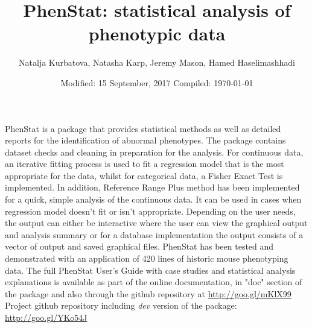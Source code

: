 \documentclass[a4paper]{article}
\begin{document}



\title{PhenStat: statistical analysis of phenotypic data}
\author{Natalja Kurbatova, Natasha Karp, Jeremy Mason, Hamed Haselimashhadi}
\date{Modified: 15 September, 2017 Compiled: \today}


\maketitle

PhenStat is a package that provides statistical methods as well as detailed reports for the identification of abnormal phenotypes.
The package contains dataset checks and cleaning in preparation for the analysis.
For continuous data, an iterative fitting process is used to fit a regression model that is the most appropriate
for the data, whilst for categorical data, a Fisher Exact Test is implemented. In addition,
Reference Range Plus method has been implemented for a quick, simple analysis of the continuous data.
It can be used in cases when regression model doesn't fit or isn't appropriate.
\newline\newline
Depending on the user needs, the output can either be interactive where the user can view the graphical output
and analysis summary or for a database implementation the output consists of a vector of output and saved
graphical files.
PhenStat has been tested and demonstrated with an application of 420 lines of historic mouse phenotyping data.
\newline\newline
The full PhenStat User's Guide with case studies and statistical analysis explanations is available as part of the
online documentation, in "doc" section of the package and also
through the github repository at \url{http://goo.gl/mKlX99}
\newline\newline
Project github repository including \emph{dev} version of the package: \url{http://goo.gl/YKo54J}\\
\end{document}
